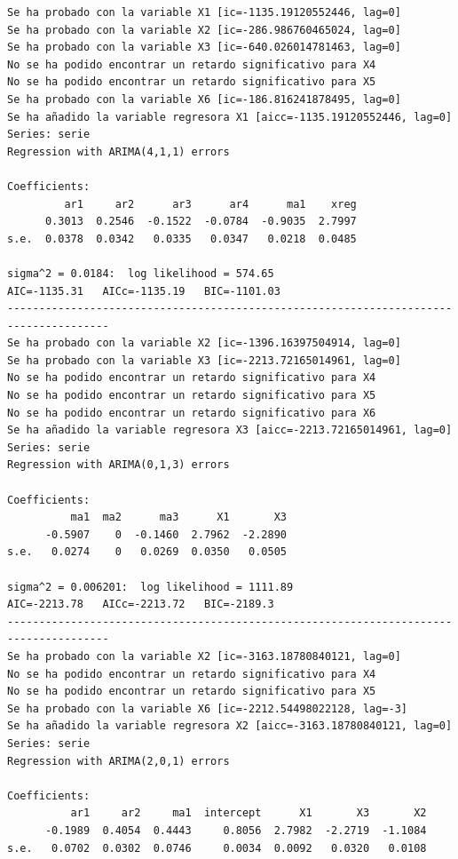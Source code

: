 \documentclass[
  12pt,
  a4paper]{article}
\begin{document}
\begin{verbatim}
Se ha probado con la variable X1 [ic=-1135.19120552446, lag=0]
Se ha probado con la variable X2 [ic=-286.986760465024, lag=0]
Se ha probado con la variable X3 [ic=-640.026014781463, lag=0]
No se ha podido encontrar un retardo significativo para X4
No se ha podido encontrar un retardo significativo para X5
Se ha probado con la variable X6 [ic=-186.816241878495, lag=0]
Se ha añadido la variable regresora X1 [aicc=-1135.19120552446, lag=0]
Series: serie 
Regression with ARIMA(4,1,1) errors 

Coefficients:
         ar1     ar2      ar3      ar4      ma1    xreg
      0.3013  0.2546  -0.1522  -0.0784  -0.9035  2.7997
s.e.  0.0378  0.0342   0.0335   0.0347   0.0218  0.0485

sigma^2 = 0.0184:  log likelihood = 574.65
AIC=-1135.31   AICc=-1135.19   BIC=-1101.03
--------------------------------------------------------------------------------------
Se ha probado con la variable X2 [ic=-1396.16397504914, lag=0]
Se ha probado con la variable X3 [ic=-2213.72165014961, lag=0]
No se ha podido encontrar un retardo significativo para X4
No se ha podido encontrar un retardo significativo para X5
No se ha podido encontrar un retardo significativo para X6
Se ha añadido la variable regresora X3 [aicc=-2213.72165014961, lag=0]
Series: serie 
Regression with ARIMA(0,1,3) errors 

Coefficients:
          ma1  ma2      ma3      X1       X3
      -0.5907    0  -0.1460  2.7962  -2.2890
s.e.   0.0274    0   0.0269  0.0350   0.0505

sigma^2 = 0.006201:  log likelihood = 1111.89
AIC=-2213.78   AICc=-2213.72   BIC=-2189.3
--------------------------------------------------------------------------------------
Se ha probado con la variable X2 [ic=-3163.18780840121, lag=0]
No se ha podido encontrar un retardo significativo para X4
No se ha podido encontrar un retardo significativo para X5
Se ha probado con la variable X6 [ic=-2212.54498022128, lag=-3]
Se ha añadido la variable regresora X2 [aicc=-3163.18780840121, lag=0]
Series: serie 
Regression with ARIMA(2,0,1) errors 

Coefficients:
          ar1     ar2     ma1  intercept      X1       X3       X2
      -0.1989  0.4054  0.4443     0.8056  2.7982  -2.2719  -1.1084
s.e.   0.0702  0.0302  0.0746     0.0034  0.0092   0.0320   0.0108


\end{verbatim}
\end{document}
